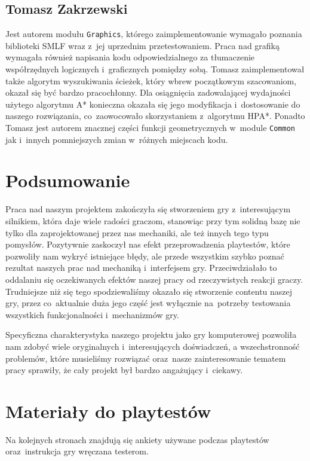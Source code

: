 \documentclass[licencjacka]{pracamgr}
\begin{document}
  \section{Tomasz Zakrzewski}
    Jest autorem modułu \texttt{Graphics}, którego zaimplementowanie wymagało poznania biblioteki SMLF wraz z~jej uprzednim przetestowaniem.
    Praca nad grafiką wymagała również napisania kodu odpowiedzialnego za tłumaczenie współrzędnych logicznych i~graficznych pomiędzy sobą.
    Tomasz zaimplementował także algorytm wyszukiwania ścieżek, który wbrew początkowym szacowaniom, okazał się być bardzo pracochłonny.
    Dla osiągnięcia zadowalającej wydajności użytego algorytmu A* konieczna okazała się jego modyfikacja i~dostosowanie do naszego rozwiązania,
    co~zaowocowało skorzystaniem z~algorytmu HPA*. Ponadto Tomasz jest autorem znacznej części funkcji geometrycznych w~module \texttt{Common}
    jak i~innych pomniejszych zmian w~różnych miejscach kodu.

\chapter{Podsumowanie}
  Praca nad naszym projektem zakończyła się stworzeniem gry z~interesującym silnikiem, która daje wiele radości graczom,
  stanowiąc przy tym solidną bazę nie tylko dla zaprojektowanej przez nas mechaniki, ale też innych tego typu pomysłów.
  Pozytywnie zaskoczył nas efekt przeprowadzenia playtestów, które pozwoliły nam wykryć istniejące błędy, 
  ale przede wszystkim szybko poznać rezultat naszych prac nad mechaniką i~interfejsem gry. Przeciwdziałało to oddalaniu
  się oczekiwanych efektów naszej pracy od rzeczywistych reakcji graczy. Trudniejsze niż się tego
  spodziewaliśmy okazało się stworzenie contentu naszej gry, przez co~aktualnie duża jego część jest wyłącznie na~potrzeby
  testowania wszystkich funkcjonalności i~mechanizmów gry. 

  Specyficzna charakterystyka naszego projektu jako gry komputerowej pozwoliła nam zdobyć wiele oryginalnych i~interesujących
  doświadczeń, a wszechstronność problemów, które musieliśmy rozwiązać oraz~nasze zainteresowanie tematem pracy sprawiły,
  że cały projekt był bardzo angażujący i~ciekawy.


\appendix

\chapter{Materiały do playtestów}
  Na kolejnych stronach znajdują się ankiety używane podczas playtestów
  oraz~instrukcja gry wręczana testerom.
\end{document}
